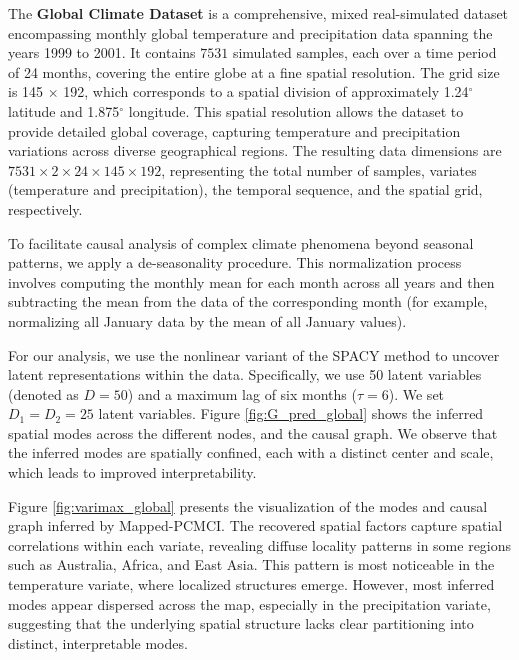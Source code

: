 
The \textbf{Global Climate Dataset} is a comprehensive, mixed real-simulated dataset encompassing monthly global temperature and precipitation data spanning the years 1999 to 2001. It contains $7531$ simulated samples, each over a time period of 24 months, covering the entire globe at a fine spatial resolution. The grid size is 145 $\times$ 192, which corresponds to a spatial division of approximately 1.24$^\circ$ latitude and 1.875$^\circ$ longitude. This spatial resolution allows the dataset to provide detailed global coverage, capturing temperature and precipitation variations across diverse geographical regions. The resulting data dimensions are $7531 \times 2 \times 24 \times 145 \times 192$, representing the total number of samples, variates (temperature and precipitation), the temporal sequence, and the spatial grid, respectively.

To facilitate causal analysis of complex climate phenomena beyond seasonal patterns, we apply a de-seasonality procedure. This normalization process involves computing the monthly mean for each month across all years and then subtracting the mean from the data of the corresponding month (for example, normalizing all January data by the mean of all January values). 

For our analysis, we use the nonlinear variant of the SPACY method to uncover latent representations within the data. Specifically, we use 50 latent variables (denoted as $D = 50$) and a maximum lag of six months ($\tau = 6$). We set $D_1=D_2 = 25$ latent variables. Figure \ref{fig:G_pred_global} shows the inferred spatial modes across the different nodes, and the causal graph. We observe that the inferred modes are spatially confined, each with a distinct center and scale, which leads to improved interpretability. 




Figure \ref{fig:varimax_global} presents the visualization of the modes and causal graph inferred by Mapped-PCMCI. The recovered spatial factors capture spatial correlations within each variate, revealing diffuse locality patterns in some regions such as Australia, Africa, and East Asia. This pattern is most noticeable in the temperature variate, where localized structures emerge. However, most inferred modes appear dispersed across the map, especially in the precipitation variate, suggesting that the underlying spatial structure lacks clear partitioning into distinct, interpretable modes.

